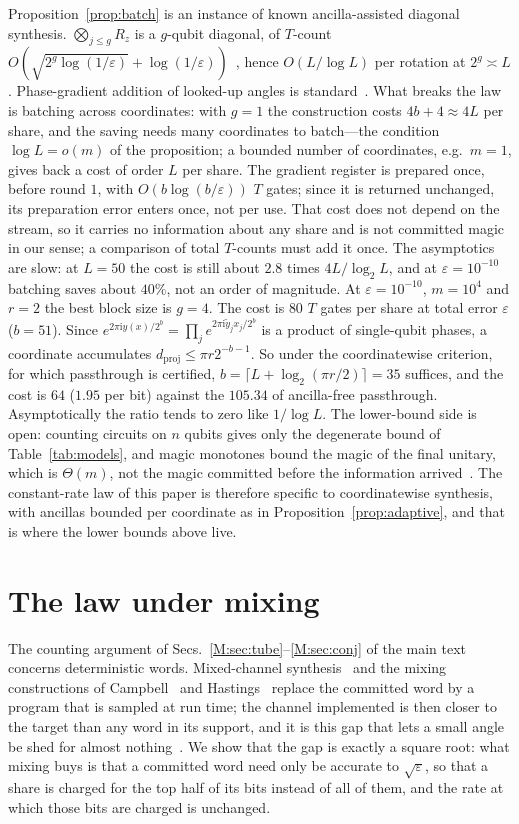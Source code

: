 \documentclass[aps,prx,twocolumn,superscriptaddress,nofootinbib,longbibliography]{revtex4-2}
\theoremstyle{plain}
\theoremstyle{definition}
\theoremstyle{remark}
\newcommand{\dproj}{d_{\mathrm{proj}}}
\begin{document}
Proposition~\ref{prop:batch} is an instance of known ancilla-assisted diagonal synthesis. $\bigotimes_{j\le g}R_z$ is a $g$-qubit diagonal, of $T$-count $O(\sqrt{2^g\log(1/\varepsilon)}+\log(1/\varepsilon))$~\cite{LKS,GKW}, hence $O(L/\log L)$ per rotation at $2^g\asymp L$. Phase-gradient addition of looked-up angles is standard~\cite{Gidney,Sanders}. What breaks the law is batching across coordinates: with $g=1$ the construction costs $4b+4\approx4L$ per share, and the saving needs many coordinates to batch---the condition $\log L=o(m)$ of the proposition; a bounded number of coordinates, e.g.\ $m=1$, gives back a cost of order $L$ per share. The gradient register is prepared once, before round $1$, with $O(b\log(b/\varepsilon))$ $T$ gates; since it is returned unchanged, its preparation error enters once, not per use. That cost does not depend on the stream, so it carries no information about any share and is not committed magic in our sense; a comparison of total $T$-counts must add it once. The asymptotics are slow: at $L=50$ the cost is still about $2.8$ times $4L/\log_2L$, and at $\varepsilon=10^{-10}$ batching saves about $40\%$, not an order of magnitude.
At $\varepsilon=10^{-10}$, $m=10^4$ and $r=2$ the best block size is $g=4$. The cost is $80$ $T$ gates per share at total error $\varepsilon$ ($b=51$). Since $e^{2\pi\mathrm iy(x)/2^b}=\prod_je^{2\pi\mathrm i\tilde y_jx_j/2^b}$ is a product of single-qubit phases, a coordinate accumulates $\dproj\le\pi r2^{-b-1}$. So under the coordinatewise criterion, for which passthrough is certified, $b=\lceil L+\log_2(\pi r/2)\rceil=35$ suffices, and the cost is $64$ ($1.95$ per bit) against the $105.34$ of ancilla-free passthrough. Asymptotically the ratio tends to zero like $1/\log L$. The lower-bound side is open: counting circuits on $n$ qubits gives only the degenerate bound of Table~\ref{tab:models}, and magic monotones bound the magic of the final unitary, which is $\Theta(m)$, not the magic committed before the information arrived~\cite{BCHK,GKW}. The constant-rate law of this paper is therefore specific to coordinatewise synthesis, with ancillas bounded per coordinate as in Proposition~\ref{prop:adaptive}, and that is where the lower bounds above live.

\section{The law under mixing}\label{sec:mixing}

The counting argument of Secs.~\ref{M:sec:tube}--\ref{M:sec:conj} of the main text concerns deterministic words. Mixed-channel synthesis~\cite{KLMPP,Bothe} and the mixing constructions of Campbell~\cite{Campbell17} and Hastings~\cite{Hastings17} replace the committed word by a program that is sampled at run time; the channel implemented is then closer to the target than any word in its support, and it is this gap that lets a small angle be shed for almost nothing~\cite{Bothe}. We show that the gap is exactly a square root: what mixing buys is that a committed word need only be accurate to $\sqrt\varepsilon$, so that a share is charged for the top half of its bits instead of all of them, and the rate at which those bits are charged is unchanged.
\end{document}
